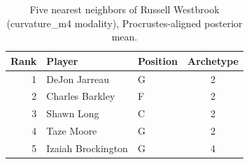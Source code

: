 \begin{table}[htbp]
  \centering\small
  \begin{tabular}{rllc}
    \toprule
    Rank & Player & Position & Archetype \\
    \midrule
    1 & DeJon Jarreau & G & 2 \\
    2 & Charles Barkley & F & 2 \\
    3 & Shawn Long & C & 2 \\
    4 & Taze Moore & G & 2 \\
    5 & Izaiah Brockington & G & 4 \\
    \bottomrule
  \end{tabular}
  \caption{Five nearest neighbors of Russell Westbrook (curvature_m4 modality), Procrustes-aligned posterior mean.}
  \label{tab:Russell_Westbrook_neighbors_curvature_m4}
\end{table}

